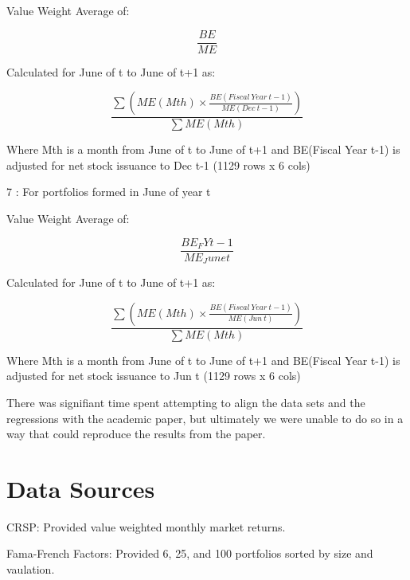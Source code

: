 \documentclass[12pt]{article}
\begin{document}
Value Weight Average of:

\[
\frac{BE}{ME}
\]

Calculated for June of t to June of t+1 as:    

\[
\frac{\sum \left( ME(Mth) \times \frac{BE(Fiscal\ Year\ t-1)}{ME(Dec\ t-1)} \right)}
     {\sum ME(Mth)}
\]

Where Mth is a month from June of t to June of t+1 and BE(Fiscal Year t-1) is adjusted for net stock issuance to Dec t-1 (1129 rows x 6 cols)


7 : For portfolios formed in June of year t   

Value Weight Average of:

\[
\frac{BE_FYt-1}{ME_June t}
\]

Calculated for June of t to June of t+1 as:    

\[
\frac{\sum \left( ME(Mth) \times \frac{BE(Fiscal\ Year\ t-1)}{ME(Jun\ t)} \right)}
     {\sum ME(Mth)}
\]

Where Mth is a month from June of t to June of t+1 and BE(Fiscal Year t-1) is adjusted for net stock issuance to Jun t (1129 rows x 6 cols)



There was signifiant time spent attempting to align the data sets and the regressions with the academic paper, but 
ultimately we were unable to do so in a way that could reproduce the results from the paper.




\doublespacing
\section{Data Sources}

CRSP: Provided value weighted monthly market returns.

Fama-French Factors: Provided 6, 25, and 100 portfolios sorted by size and vaulation.
\end{document}
